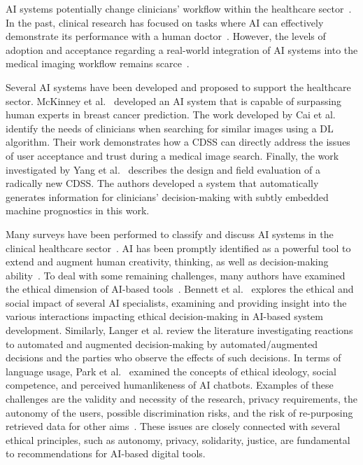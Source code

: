 AI systems potentially change clinicians' workflow within the healthcare sector~\cite{wallis2019artificial}.
In the past, clinical research has focused on tasks where AI can effectively demonstrate its performance with a human doctor~\cite{Buch143}.
However, the levels of adoption and acceptance regarding a real-world integration of AI systems into the medical imaging workflow remains scarce~\cite{Fan2020}.

Several AI systems have been developed and proposed to support the healthcare sector.
McKinney et al.~\cite{McKinney2020} developed an AI system that is capable of surpassing human experts in breast cancer prediction.
The work developed by Cai et al.~\cite{Cai:2019:HTC:3290605.3300234} identify the needs of clinicians when searching for similar images using a DL algorithm.
Their work demonstrates how a CDSS can directly address the issues of user acceptance and trust during a medical image search.
Finally, the work investigated by Yang et al.~\cite{10.1145/3290605.3300468} describes the design and field evaluation of a radically new CDSS.
The authors developed a system that automatically generates information for clinicians' decision-making with subtly embedded machine prognostics in this work.

Many surveys have been performed to classify and discuss AI systems in the clinical healthcare sector~\cite{CORONATO2020101964, LANGER2021106878, PELAU2021106855, STADIN2021106486}.
AI has been promptly identified as a powerful tool to extend and augment human creativity, thinking, as well as decision-making ability~\cite{CORONATO2020101964}.
To deal with some remaining challenges, many authors have examined the ethical dimension of AI-based tools~\cite{10.1145/3311957.3361858, LANGER2021106878, PARK2021106795}.
Bennett et al.~\cite{10.1145/3311957.3361858} explores the ethical and social impact of several AI specialists, examining and providing insight into the various interactions impacting ethical decision-making in AI-based system development.
Similarly, Langer et al. review the literature investigating reactions to automated and augmented decision-making by automated/augmented decisions and the parties who observe the effects of such decisions.
In terms of language usage, Park et al.~\cite{PARK2021106795} examined the concepts of ethical ideology, social competence, and perceived humanlikeness of AI chatbots.
Examples of these challenges are the validity and necessity of the research, privacy requirements, the autonomy of the users, possible discrimination risks, and the risk of re-purposing retrieved data for other aims~\cite{DEANGELI2020102412}.
These issues are closely connected with several ethical principles, such as autonomy, privacy, solidarity, justice, are fundamental to recommendations for AI-based digital tools.

